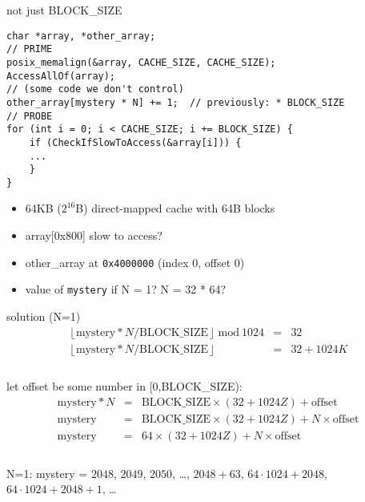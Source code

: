 \begin{frame}[fragile]{not just BLOCK\_SIZE}
\begin{Verbatim}[fontsize=\fontsize{9}{10}]
char *array, *other_array;
// PRIME
posix_memalign(&array, CACHE_SIZE, CACHE_SIZE);
AccessAllOf(array);
// (some code we don't control)
other_array[mystery * N] += 1;  // previously: * BLOCK_SIZE
// PROBE
for (int i = 0; i < CACHE_SIZE; i += BLOCK_SIZE) {
    if (CheckIfSlowToAccess(&array[i])) {
    ...
    }
}
\end{Verbatim}
\begin{itemize}
\item 64KB ($2^{16}$B) direct-mapped cache with 64B blocks
\item array[0x800] slow to access?
\item other\_array at \texttt{0x4000000} (index 0, offset 0)
\item value of \texttt{mystery} if N = 1? N = 32 * 64?
\end{itemize}
\end{frame}

\begin{frame}{solution (N=1)}
\vspace{-1cm}
\begin{eqnarray*}
\left\lfloor\text{mystery} * N / \text{BLOCK\_SIZE}\right\rfloor~\text{mod}~1024 & = & 32 \\
\left\lfloor\text{mystery} * N / \text{BLOCK\_SIZE}\right\rfloor & = & 32 + 1024K \\
\end{eqnarray*}
\\
let offset be some number in [0,BLOCK\_SIZE): \\
\vspace{-1cm}
\begin{eqnarray*}
\text{mystery} * N & = & \text{BLOCK\_SIZE}\times(32+1024Z) + \text{offset}\\
\text{mystery} & = & \text{BLOCK\_SIZE}\times(32+1024Z) + N\times\text{offset} \\
\text{mystery} & = & 64\times(32+1024Z)+N\times\text{offset} \\
\end{eqnarray*}
\\
N=1: mystery = $2048$, $2049$, $2050$, \ldots, $2048+63$, $64\cdot1024+2048$, $64\cdot1024+2048+1$, \ldots
\end{frame}

